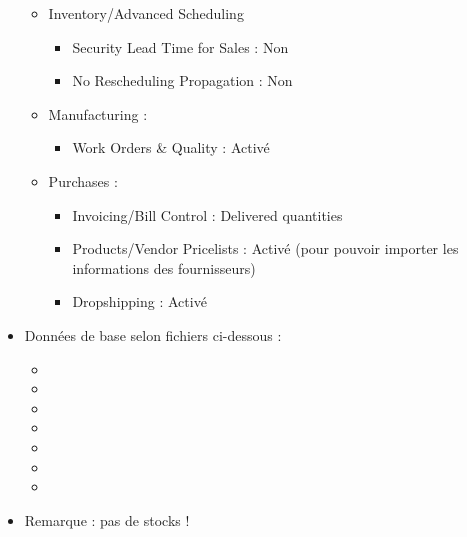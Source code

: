 \documentclass[letterpaper,10pt,french]{sphinxmanual}
\begin{document}
\begin{itemize}
\begin{itemize}
\begin{itemize}
\end{itemize}

\item {} 
Inventory/Advanced Scheduling
\begin{itemize}
\item {} 
Security Lead Time for Sales : Non

\item {} 
No Rescheduling Propagation : Non

\end{itemize}

\item {} 
Manufacturing :
\begin{itemize}
\item {} 
Work Orders \& Quality : Activé

\end{itemize}

\item {} 
Purchases :
\begin{itemize}
\item {} 
Invoicing/Bill Control : Delivered quantities

\item {} 
Products/Vendor Pricelists : Activé (pour pouvoir importer les informations des fournisseurs)

\item {} 
Dropshipping : Activé

\end{itemize}

\end{itemize}

\item {} 
Données de base selon fichiers ci-dessous :
\begin{itemize}
\item {} 

\item {} 

\item {} 

\item {} 

\item {} 

\item {} 

\item {} 

\end{itemize}

\item {} 
Remarque : pas de stocks !

\end{itemize}
\end{document}
